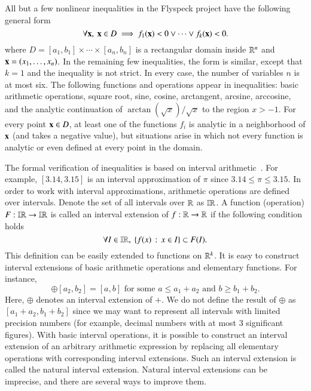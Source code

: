 All but a few nonlinear inequalities in the Flyspeck project have the
following general form
\begin{equation}\label{eqn:D}
\forall {\bf x},\ {\bf x} \in D \implies f_1({\bf x}) < 0 \vee \cdots \vee f_k({\bf x}) < 0.
\end{equation}
where $D = [a_1,b_1] \times \cdots \times [a_n, b_n]$ is a rectangular
domain inside $\mathbb{R}^n$ and ${\bf x} = (x_1,\ldots,x_n)$. In the remaining
few inequalities, the form is similar, except that $k=1$ and the
inequality is not strict.  In every case, the number of variables $n$
is at most six. The following functions and operations appear in
inequalities: basic arithmetic operations, square root, sine, cosine,
arctangent, arcsine, arccosine, and the analytic continuation of
$\arctan(\sqrt{x})/\sqrt{x}$ to the region $x > -1$.  For every point
${\bf x}\in D$, at least one of the functions $f_i$ is analytic in a
neighborhood of ${\bf x}$ (and takes a negative value), but situations
arise in which not every function is analytic or even defined at every
point in the domain.

The formal verification of inequalities is based on interval
arithmetic~\cite{moore2009introduction}.  For example, $[3.14, 3.15]$
is an interval approximation of $\pi$ since $3.14 \le \pi \le 3.15$.
In order to work with interval approximations, arithmetic operations
are defined over intervals. Denote the set of all intervals over $\mathbb{R}$
as $\mathbb{IR}$. A function (operation) $F:\mathbb{IR} \to \mathbb{IR}$ is called an interval
extension of $f:\mathbb{R} \to \mathbb{R}$ if the following condition holds
\begin{equation*}
\forall I \in \mathbb{IR},\ \{ f(x)\,:\,x \in I \} \subset F(I).
\end{equation*}
This definition can be easily extended to functions on $\mathbb{R}^k$. It is
easy to construct interval extensions of basic arithmetic operations
and elementary functions. For instance,
\begin{equation*}
[a_1,b_1] \oplus [a_2,b_2]= [a, b] 
\text { for some $a \le a_1 + a_2$ and $b \ge b_1 + b_2$}.
\end{equation*}
Here, $\oplus$ denotes an interval extension of $+$. We do not define
the result of $\oplus$ as $[a_1 + a_2, b_1 + b_2]$ since we may want
to represent all intervals with limited precision numbers (for
example, decimal numbers with at most 3 significant figures). With
basic interval operations, it is possible to construct an interval
extension of an arbitrary arithmetic expression by replacing all
elementary operations with corresponding interval extensions. Such an
interval extension is called the natural interval extension. Natural
interval extensions can be imprecise, and there are several ways to
improve them. 

